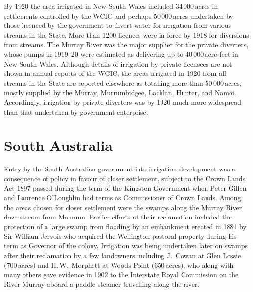By 1920 the area irrigated in New South Wales included 34\,000\,acres
in settlements controlled by the WCIC and perhaps 50\,000\,acres
undertaken by those licenced by the government to divert water for
irrigation from various streams in the State.  More than 1200 licences
were in force by 1918 for diversions from streams.  The Murray River
was the major supplier for the private diverters, whose pumps in
1919--20 were estimated as delivering up to 40\,000\,acre-feet in New
South Wales.  Although details of irrigation by private licensees are
not shown in annual reports of the WCIC, the areas irrigated in 1920
from all streams in the State are reported elsewhere as totalling more
than 50\,000\,acres, mostly supplied by the Murray, Murrumbidgee,
Lachlan, Hunter, and Namoi.  Accordingly, irrigation by private
diverters was by 1920 much more widespread than that undertaken by
government enterprise.

\section*{South Australia}

Entry by the South Australian government into irrigation development
was a consequence of policy in favour of closer settlement, subject to
the Crown Lands Act 1897 passed during the term of the Kingston
Government when Peter Gillen and Laurence O'Loughlin had terms as
Commissioner of Crown Lands.  Among the areas chosen for closer
settlement were the swamps along the Murray River downstream from
Mannum.  Earlier efforts at their reclamation included the protection
of a large swamp from flooding by an embankment erected in 1881 by Sir
William Jervois  who acquired the Wellington
pastoral property during his term as Governor of the colony.
Irrigation was being undertaken later on swamps after their
reclamation by a few landowners including J.~Cowan 
at Glen Lossie (700\,acres) and H.\,W.~Morphett 
at Woods Point (650\,acres), who along with many others gave evidence
in 1902 to the Interstate Royal Commission on the River Murray aboard
a paddle steamer travelling along the river.

